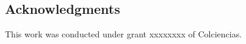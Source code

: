 \documentclass[11pt,letterpaper]{article}
\begin{document}
%
\newpage


{}


%

%

\newpage
\subsection*{Acknowledgments}
{}
This work was conducted under grant xxxxxxxx of Colciencias.




      

             
\end{document}
